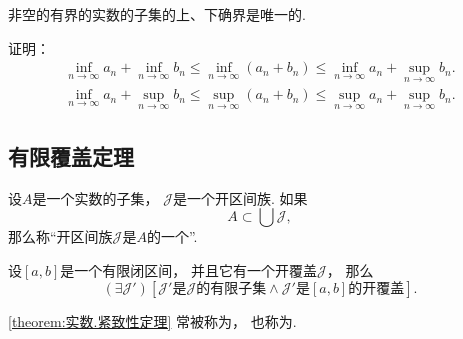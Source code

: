 \begin{theorem}
非空的有界的实数的子集的上、下确界是唯一的.
\end{theorem}

\begin{example}\label{example:实数.确界的序}
%
证明：\begin{gather}
	\inf_{n\to\infty} a_n
	+ \inf_{n\to\infty} b_n
	\leq \inf_{n\to\infty} (a_n + b_n)
	\leq \inf_{n\to\infty} a_n
	+ \sup_{n\to\infty} b_n. \\
	\inf_{n\to\infty} a_n
	+ \sup_{n\to\infty} b_n
	\leq \sup_{n\to\infty} (a_n + b_n)
	\leq \sup_{n\to\infty} a_n
	+ \sup_{n\to\infty} b_n.
\end{gather}
\end{example}

\subsection{有限覆盖定理}
\begingroup
\def\J{\mathscr{J}}%
\begin{definition}
设\(A\)是一个实数的子集，
\(\J\)是一个开区间族.
如果\[
	A \subset \bigcup \J,
\]
那么称“开区间族\(\J\)是\(A\)的一个”.
\end{definition}

\begin{theorem}[紧致性定理]\label{theorem:实数.紧致性定理}
设\([a,b]\)是一个有限闭区间，
并且它有一个开覆盖\(\J\)，
那么\[
	(\exists \J')
	[
		\text{\(\J'\)是\(\J\)的有限子集}
		\land
		\text{\(\J'\)是\([a,b]\)的开覆盖}
	].
\]
\end{theorem}
\cref{theorem:实数.紧致性定理} 常被称为，
也称为.

\endgroup%
